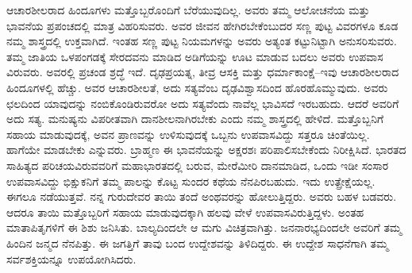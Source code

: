 ಆಚಾರಶೀಲರಾದ ಹಿಂದೂಗಳು ಮತ್ತೊಬ್ಬರೊಂದಿಗೆ ಬೆರೆಯುವುದಿಲ್ಲ. ಅವರು ತಮ್ಮ ಆಲೋಚನೆಯ ಮತ್ತು ಭಾವನೆಯ ಪ್ರಪಂಚದಲ್ಲಿ ಮಾತ್ರ ವಿಹರಿಸುವರು. ಅವರ ಜೀವನ ಹೇಗಿರಬೇಕೆಂಬುದರ ಸಣ್ಣ ಪುಟ್ಟ ವಿವರಗಳೂ ಕೂಡ ನಮ್ಮ ಶಾಸ್ತ್ರದಲ್ಲಿ ಉಕ್ತವಾಗಿದೆ. ಇಂತಹ ಸಣ್ಣ ಪುಟ್ಟ ನಿಯಮಗಳನ್ನು ಅವರು ಅತ್ಯಂತ ಕಟ್ಟುನಿಟ್ಟಾಗಿ ಅನುಸರಿಸುವರು. ತಮ್ಮ ಜಾತಿಯ ಒಳಪಂಗಡಕ್ಕೆ ಸೇರದವನು ಮಾಡಿದ ಅಡಿಗೆಯನ್ನು ಊಟ ಮಾಡುವ ಬದಲು ಅವರು ಉಪವಾಸ ವಿರುವರು. ಅವರಲ್ಲಿ ಪ್ರಚಂಡ ಶ್ರದ್ಧೆ ಇದೆ. ದೃಢಪ್ರಯತ್ನ, ತೀವ್ರ ಆಸಕ್ತಿ ಮತ್ತು ಧರ್ಮಾಕಾಂಕ್ಷೆ–ಇವು ಆಚಾರಶೀಲರಾದ ಹಿಂದೂಗಳಲ್ಲಿ ಹೆಚ್ಚು. ಅವರ ಆಚಾರಶೀಲತೆ, ಅದು ಸತ್ಯವೆಂಬ ದೃಢವಿಶ್ವಾಸದಿಂದ ಹೊರಹೊಮ್ಮುವುದು. ಅವರು ಛಲದಿಂದ ಯಾವುದನ್ನು ನಂಬಿಕೊಂಡಿರುವರೋ ಅದು ಸತ್ಯವೆಂದು ನಾವೆಲ್ಲ ಭಾವಿಸದೆ ಇರಬಹುದು. ಆದರೆ ಅವರಿಗೆ ಅದು ಸತ್ಯ. ಮನುಷ್ಯನು ವಿಪರೀತವಾಗಿ ದಾನಶೀಲನಾಗಿರಬೇಕು ಎಂದು ನಮ್ಮ ಶಾಸ್ತ್ರದಲ್ಲಿ ಹೇಳಿದೆ. ಮತ್ತೊಬ್ಬನಿಗೆ ಸಹಾಯ ಮಾಡುವುದಕ್ಕೆ, ಅವನ ಪ್ರಾಣವನ್ನು ಉಳಿಸುವುದಕ್ಕೆ ಒಬ್ಬನು ಉಪವಾಸವಿದ್ದು ಸತ್ತರೂ ಚಿಂತೆಯಿಲ್ಲ. ಹಾಗೆಯೇ ಮಾಡಬೇಕು ಎನ್ನುವರು. ಬ್ರಾಹ್ಮಣ ಈ ಭಾವನೆಯನ್ನು ಅಕ್ಷರಶಃ ಪರಿಪಾಲಿಸಬೇಕೆಂದು ನಿರೀಕ್ಷಿಸಿದೆ. ಭಾರತದ ಸಾಹಿತ್ಯದ ಪರಿಚಯವಿರುವವರಿಗೆ ಮಹಾಭಾರತದಲ್ಲಿ ಬರುವ, ಮೇರೆಮೀರಿ ದಾನಮಾಡಿದ, ಒಂದು ಇಡೀ ಸಂಸಾರ ಉಪವಾಸವಿದ್ದು ಭಿಕ್ಷುಕನಿಗೆ ತಮ್ಮ ಪಾಲನ್ನು ಕೊಟ್ಟ ಸುಂದರ ಕಥೆಯ ನೆನಪಿರಬಹುದು. ಇದು ಉತ್ಪ್ರೇಕ್ಷೆಯಲ್ಲ. ಈಗಲೂ ನಡೆಯುತ್ತವೆ. ನನ್ನ ಗುರುದೇವರ ತಾಯಿ ತಂದೆ ಅಂಥವರನ್ನು ಹೋಲುತ್ತಿದ್ದರು. ಅವರು ಬಹಳ ಬಡವರು. ಆದರೂ ತಾಯಿ ಮತ್ತೊಬ್ಬರಿಗೆ ಸಹಾಯ ಮಾಡುವುದಕ್ಕಾಗಿ ಹಲವು ವೇಳೆ ಉಪವಾಸವಿರುತ್ತಿದ್ದಳು. ಅಂತಹ ಮಾತಾಪಿತೃಗಳಿಗೆ ಈ ಶಿಶು ಜನಿಸಿತು. ಬಾಲ್ಯದಿಂದಲೇ ಆ ಮಗು ವಿಚಿತ್ರವಾಗಿತ್ತು. ಜನನಾರಭ್ಯದಿಂದಲೇ ಅವರಿಗೆ ತಮ್ಮ ಹಿಂದಿನ ಜನ್ಮದ ನೆನಪಿತ್ತು. ಈ ಜಗತ್ತಿಗೆ ತಾವು ಬಂದ ಉದ್ದೇಶವನ್ನು ತಿಳಿದಿದ್ದರು. ಈ ಉದ್ದೇಶ ಸಾಧನೆಗಾಗಿ ತಮ್ಮ ಸರ್ವಶಕ್ತಿಯನ್ನೂ ಉಪಯೋಗಿಸಿದರು.

